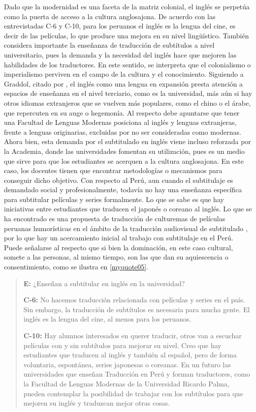 \documentclass[spanish]{textolivre}
\newenvironment{MyQuote}{%
    \begin{myQuoteEnumerate}[resume=*,series=MyQuoteSeries]%
    \item \begin{quote}%
}{%
    \end{quote}%
    \end{myQuoteEnumerate}%
}%
\begin{document}
Dado que la modernidad es una faceta de la matriz colonial, el inglés se perpetúa como la puerta de acceso a la cultura anglosajona. De acuerdo con las entrevistadas C-6 y C-10, para los peruanos el inglés es la lengua del cine, es decir de las películas, lo que produce una mejora en su nivel lingüístico. También considera importante la enseñanza de traducción de subtítulos a nivel universitario, pues la demanda y la necesidad del inglés hace que mejoren las habilidades de los traductores. En este sentido, se interpreta que el colonialismo o imperialismo perviven en el campo de la cultura y el conocimiento. Siguiendo a Graddol, citado por \textcite{gregson2006english}, el inglés como una lengua en expansión presta atención a espacios de enseñanza en el nivel terciario, como es la universidad, más aún si hay otros idiomas extranjeros que se vuelven más populares, como el chino o el árabe, que repercuten en su auge o hegemonía. Al respecto debe apuntarse que tener una Facultad de Lenguas Modernas posiciona al inglés y lenguas extranjeras, frente a lenguas originarias, excluidas por no ser consideradas como modernas. Ahora bien, esta demanda por el subtitulado en inglés viene incluso reforzada por la Academia, donde las universidades fomentan su utilización, pues es un medio que sirve para que los estudiantes se acerquen a la cultura anglosajona. En este caso, los docentes tienen que encontrar metodologías o mecanismos para conseguir dicho objetivo. Con respecto al Perú, aun cuando el subtitulaje es demandado social y profesionalmente, todavía no hay una enseñanza específica para subtitular películas y series formalmente. Lo que se sabe es que hay iniciativas entre estudiantes que traducen el japonés o coreano al inglés. Lo que se ha encontrado es una propuesta de traducción de culturemas de películas peruanas humorísticas en el ámbito de la traducción audiovisual de subtitulado \cite{cardenas2019analisis}, por lo que hay un acercamiento inicial al trabajo con subtitulaje en el Perú. Puede señalarse al respecto que si bien la dominación, en este caso cultural, somete a las personas, al mismo tiempo, son las que dan su aquiescencia o consentimiento, como se ilustra en \ref{myquote05}.

\begin{MyQuote}\label{myquote05}
\textbf{E:} ¿Enseñan a subtitular en inglés en la universidad?

\textbf{C-6:} No hacemos traducción relacionada con películas y series en el país. Sin embargo, la traducción de subtítulos es necesaria para mucha gente. El inglés es la lengua del cine, al menos para los peruanos.

\textbf{C-10:} Hay alumnos interesados en querer traducir, otros van a escuchar películas con y sin subtítulos para mejorar su nivel. Creo que hay estudiantes que traducen al inglés y también al español, pero de forma voluntaria, espontánea, series japonesas o coreanas. En un futuro las universidades que enseñan Traducción en Perú y forman traductores, como la Facultad de Lenguas Modernas de la Universidad Ricardo Palma, pueden contemplar la posibilidad de trabajar con los subtítulos para que mejoren su inglés y traduzcan mejor otras cosas.
\end{MyQuote}
    
\end{document}
